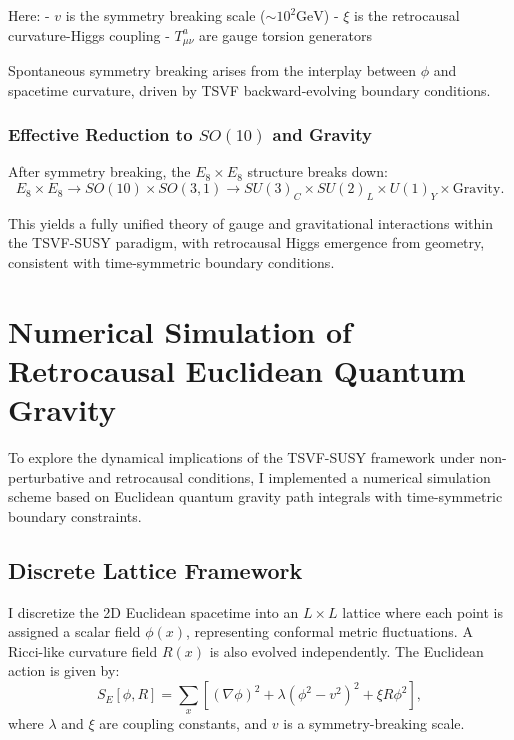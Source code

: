 \documentclass[twocolumn,superscriptaddress,floatfix]{revtex4-2}
\begin{document}
Here:
- \(v\) is the symmetry breaking scale (\(\sim 10^2 \text{GeV}\))
- \(\xi\) is the retrocausal curvature-Higgs coupling
- \(T^a_{\mu\nu}\) are gauge torsion generators

Spontaneous symmetry breaking arises from the interplay between \(\phi\) and spacetime curvature, driven by TSVF backward-evolving boundary conditions.

\subsubsection{Effective Reduction to \(SO(10)\) and Gravity}
\label{subsubsec:E8_breaking}

After symmetry breaking, the \(E_8 \times E_8\) structure breaks down:
\begin{equation}
E_8 \times E_8 \longrightarrow SO(10) \times SO(3,1) \longrightarrow SU(3)_C \times SU(2)_L \times U(1)_Y \times \text{Gravity}.
\label{eq:E8breaking}
\end{equation}

This yields a fully unified theory of gauge and gravitational interactions within the TSVF-SUSY paradigm, with retrocausal Higgs emergence from geometry, consistent with time-symmetric boundary conditions.

\section{Numerical Simulation of Retrocausal Euclidean Quantum Gravity}
\label{sec:retrocausal_simulations}

To explore the dynamical implications of the TSVF-SUSY framework under non-perturbative and retrocausal conditions, I implemented a numerical simulation scheme based on Euclidean quantum gravity path integrals with time-symmetric boundary constraints.

\subsection{Discrete Lattice Framework}
I discretize the 2D Euclidean spacetime into an $L \times L$ lattice where each point is assigned a scalar field $\phi(x)$, representing conformal metric fluctuations. A Ricci-like curvature field $R(x)$ is also evolved independently. The Euclidean action is given by:
\begin{equation}
S_E[\phi, R] = \sum_{x} \left[ (\nabla \phi)^2 + \lambda (\phi^2 - v^2)^2 + \xi R \phi^2 \right],
\end{equation}
where $\lambda$ and $\xi$ are coupling constants, and $v$ is a symmetry-breaking scale.
\end{document}
